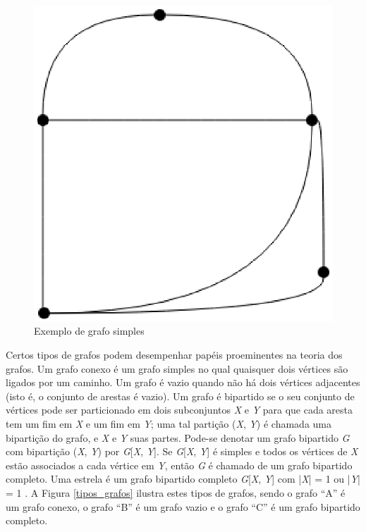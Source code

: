 \begin{figure}[!h]
	\centering
	\includegraphics[scale=0.2]{figuras/capitulo2/grafo_simples.eps}
	\caption{Exemplo de grafo simples}
	\label{grafo_simples}
\end{figure}

Certos tipos de grafos podem desempenhar papéis proeminentes na teoria dos grafos. Um grafo conexo é um grafo simples no qual quaisquer dois vértices são ligados por um caminho. Um grafo é vazio quando não há dois vértices adjacentes (isto é, o conjunto de arestas é vazio). Um grafo é bipartido se o seu conjunto de vértices pode ser particionado em dois subconjuntos \textit{X} e \textit{Y} para que cada aresta tem um fim em \textit{X} e um fim em \textit{Y}; uma tal partição (\textit{X}, \textit{Y}) é chamada uma bipartição do grafo, e \textit{X} e \textit{Y} suas partes. Pode-se denotar um grafo bipartido \textit{G} com bipartição (\textit{X}, \textit{Y}) por \textit{G}[\textit{X}, \textit{Y}]. Se \textit{G}[\textit{X}, \textit{Y}] é simples e todos os vértices de \textit{X} estão associados a cada vértice em \textit{Y}, então \textit{G} é chamado de um grafo bipartido completo. Uma estrela é um grafo bipartido completo \textit{G}[\textit{X}, \textit{Y}] com |\textit{X}| = 1 ou |\textit{Y}| = 1 \cite{Diestel:1997}.  A Figura \ref{tipos_grafos} ilustra estes tipos de grafos, sendo o grafo ``A'' é um grafo conexo, o grafo ``B'' é um grafo vazio e o grafo ``C'' é um grafo bipartido completo.

